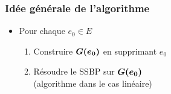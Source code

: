 \begin{frame}[label=AlgoCapaciteInfinie]
  \frametitle{Idée générale de l'algorithme}
  \begin{center}
    \begin{minipage}[c]{\linewidth}
      \begin{minipage}[c]{.2\linewidth}
        \begin{overlayarea}{\textwidth}{0.28\textheight}
        \end{overlayarea}
      \end{minipage}
      \begin{minipage}[c]{.8\linewidth}
        \begin{overlayarea}{\textwidth}{0.28\textheight}
          \begin{itemize}
          \item<2-> Pour chaque $e_0 \in E$
            \begin{enumerate}
            \item<3-> Construire $\boldsymbol{G(e_0)}$ en supprimant $e_0$
            \item<4-> Résoudre le SSBP sur $\boldsymbol{G(e_0)}$\\
            (algorithme dans le cas linéaire)
            \end{enumerate}
          \end{itemize}
        \end{overlayarea}
      \end{minipage}
    \end{minipage}
    \begin{minipage}[c]{\linewidth}
      \begin{minipage}[c]{.2\linewidth}
        \begin{overlayarea}{\textwidth}{\textheight}

\end{overlayarea}
\end{minipage}
\end{minipage}
\end{center}
\end{frame}
